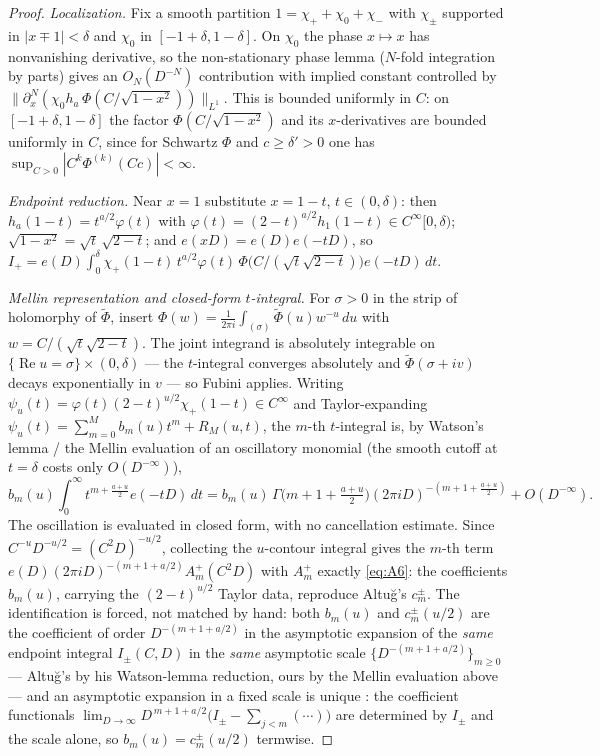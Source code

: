 \documentclass[11pt]{article}
\theoremstyle{definition}
\newcommand{\wt}[1]{\widetilde{#1}}
\renewcommand{\Re}{\operatorname{Re}}
\begin{document}
\begin{proof}
\emph{Localization.} Fix a smooth partition $1=\chi_++\chi_0+\chi_-$ with $\chi_\pm$ supported in
$|x\mp1|<\delta$ and $\chi_0$ in $[-1+\delta,1-\delta]$. On $\chi_0$ the phase $x\mapsto x$ has
nonvanishing derivative, so the non-stationary phase lemma \cite[Thm.~7.7.1]{Hormander} ($N$-fold
integration by parts) gives an $O_N(D^{-N})$ contribution with implied constant controlled by
$\|\partial_x^N(\chi_0 h_a\,\Phi(C/\sqrt{1-x^2}))\|_{L^1}$. This is bounded uniformly in $C$: on
$[-1+\delta,1-\delta]$ the factor $\Phi(C/\sqrt{1-x^2})$ and its $x$-derivatives are bounded uniformly
in $C$, since for Schwartz $\Phi$ and $c\ge\delta'>0$ one has $\sup_{C>0}|C^k\Phi^{(k)}(Cc)|<\infty$.

\emph{Endpoint reduction.} Near $x=1$ substitute $x=1-t$, $t\in(0,\delta)$: then
$h_a(1-t)=t^{a/2}\varphi(t)$ with $\varphi(t)=(2-t)^{a/2}h_1(1-t)\in C^\infty[0,\delta)$;
$\sqrt{1-x^2}=\sqrt t\,\sqrt{2-t}$; and $e(xD)=e(D)e(-tD)$, so
$I_+=e(D)\int_0^\delta \chi_+(1-t)\,t^{a/2}\varphi(t)\,\Phi\big(C/(\sqrt t\sqrt{2-t})\big)e(-tD)\,dt$.

\emph{Mellin representation and closed-form $t$-integral.} For $\sigma>0$ in the strip of holomorphy
of $\wt\Phi$, insert $\Phi(w)=\frac1{2\pi i}\int_{(\sigma)}\wt\Phi(u)w^{-u}\,du$ with
$w=C/(\sqrt t\sqrt{2-t})$. The joint integrand is absolutely integrable on
$\{\Re u=\sigma\}\times(0,\delta)$ --- the $t$-integral converges absolutely and $\wt\Phi(\sigma+iv)$
decays exponentially in $v$ --- so Fubini applies. Writing
$\psi_u(t)=\varphi(t)(2-t)^{u/2}\chi_+(1-t)\in C^\infty$ and Taylor-expanding
$\psi_u(t)=\sum_{m=0}^{M}b_m(u)t^m+R_M(u,t)$, the $m$-th $t$-integral is, by Watson's lemma / the
Mellin evaluation of an oscillatory monomial \cite[Ch.~3]{Wong} (the smooth cutoff at $t=\delta$ costs
only $O(D^{-\infty})$),
\[
  b_m(u)\!\int_0^\infty t^{m+\frac{a+u}{2}}e(-tD)\,dt
  = b_m(u)\,\Gamma\!\big(m{+}1{+}\tfrac{a+u}{2}\big)(2\pi iD)^{-(m+1+\frac{a+u}{2})}+O(D^{-\infty}).
\]
The oscillation is evaluated in closed form, with no cancellation estimate. Since
$C^{-u}D^{-u/2}=(C^2D)^{-u/2}$, collecting the $u$-contour integral gives the $m$-th term
$e(D)(2\pi iD)^{-(m+1+a/2)}A^+_m(C^2D)$ with $A^+_m$ exactly \eqref{eq:A6}: the coefficients $b_m(u)$,
carrying the $(2-t)^{u/2}$ Taylor data, reproduce Altu\u{g}'s $c^\pm_m$. The identification is forced, not
matched by hand: both $b_m(u)$ and $c^\pm_m(u/2)$ are the coefficient of order $D^{-(m+1+a/2)}$ in the
asymptotic expansion of the \emph{same} endpoint integral $I_\pm(C,D)$ in the \emph{same} asymptotic scale
$\{D^{-(m+1+a/2)}\}_{m\ge0}$ --- Altu\u{g}'s by his Watson-lemma reduction, ours by the Mellin evaluation
above --- and an asymptotic expansion in a fixed scale is unique \cite[Ch.~1]{Wong}: the coefficient
functionals $\lim_{D\to\infty}D^{\,m+1+a/2}\big(I_\pm-\sum_{j<m}(\cdots)\big)$ are determined by $I_\pm$ and
the scale alone, so $b_m(u)=c^\pm_m(u/2)$ termwise.


\end{proof}
\end{document}
